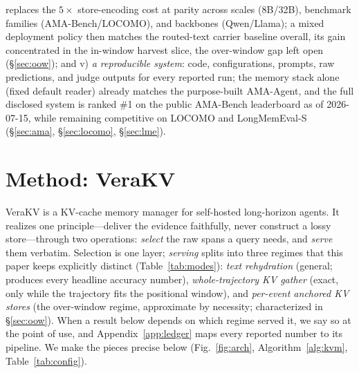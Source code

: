\documentclass{article} %
\newcommand{\kvm}{VeraKV}
\begin{document}
replaces the $5\times$ store-encoding cost at parity across scales (8B/32B),
benchmark families (AMA-Bench/LOCOMO), and backbones (Qwen/Llama); a mixed
deployment policy then matches the routed-text carrier baseline overall, its gain
concentrated in the in-window harvest slice, the over-window gap left open
(\S\ref{sec:oow}); and v) \emph{a reproducible system}: code, configurations,
prompts, raw predictions, and judge outputs for every reported run; the memory
stack alone (fixed default reader) already matches the purpose-built AMA-Agent, and
the full disclosed system is ranked \#1 on the public AMA-Bench leaderboard as of
2026-07-15, while remaining competitive on LOCOMO and LongMemEval-S
(\S\ref{sec:ama}, \S\ref{sec:locomo}, \S\ref{sec:lme}).

\section{Method: \kvm{}}
\label{sec:method}

\kvm{} is a KV-cache memory manager for self-hosted long-horizon agents. It
realizes one principle---deliver the evidence faithfully, never construct a lossy
store---through two operations: \emph{select} the raw spans a query needs, and
\emph{serve} them verbatim. Selection is one layer; \emph{serving} splits into
three regimes that this paper keeps explicitly distinct (Table~\ref{tab:modes}):
\emph{text rehydration} (general; produces every headline accuracy number),
\emph{whole-trajectory KV gather} (exact, only while the trajectory fits the
positional window), and \emph{per-event anchored KV stores} (the over-window
regime, approximate by necessity; characterized in \S\ref{sec:oow}). When a result
below depends on which regime served it, we say so at the point of use, and
Appendix~\ref{app:ledger} maps every reported number to its pipeline. We make the
pieces precise below (Fig.~\ref{fig:arch}, Algorithm~\ref{alg:kvm},
Table~\ref{tab:config}).
\end{document}
